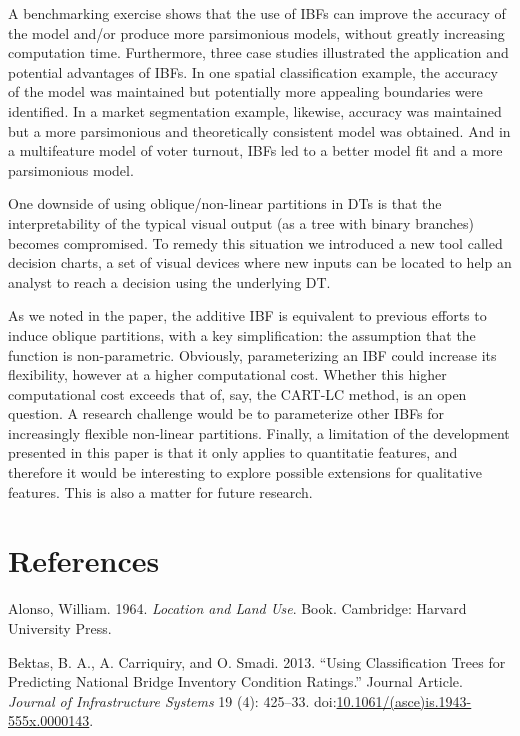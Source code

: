 \documentclass[]{elsarticle} %
\begin{document}
A benchmarking exercise shows that the use of IBFs can improve the
accuracy of the model and/or produce more parsimonious models, without
greatly increasing computation time. Furthermore, three case studies
illustrated the application and potential advantages of IBFs. In one
spatial classification example, the accuracy of the model was maintained
but potentially more appealing boundaries were identified. In a market
segmentation example, likewise, accuracy was maintained but a more
parsimonious and theoretically consistent model was obtained. And in a
multifeature model of voter turnout, IBFs led to a better model fit and
a more parsimonious model.

One downside of using oblique/non-linear partitions in DTs is that the
interpretability of the typical visual output (as a tree with binary
branches) becomes compromised. To remedy this situation we introduced a
new tool called decision charts, a set of visual devices where new
inputs can be located to help an analyst to reach a decision using the
underlying DT.

As we noted in the paper, the additive IBF is equivalent to previous
efforts to induce oblique partitions, with a key simplification: the
assumption that the function is non-parametric. Obviously,
parameterizing an IBF could increase its flexibility, however at a
higher computational cost. Whether this higher computational cost
exceeds that of, say, the CART-LC method, is an open question. A
research challenge would be to parameterize other IBFs for increasingly
flexible non-linear partitions. Finally, a limitation of the development
presented in this paper is that it only applies to quantitatie features,
and therefore it would be interesting to explore possible extensions for
qualitative features. This is also a matter for future research.

\section*{References}\label{references}

\hypertarget{refs}{}
\hypertarget{ref-Alonso1964}{}
Alonso, William. 1964. \emph{Location and Land Use}. Book. Cambridge:
Harvard University Press.

\hypertarget{ref-Bektas2013}{}
Bektas, B. A., A. Carriquiry, and O. Smadi. 2013. ``Using Classification
Trees for Predicting National Bridge Inventory Condition Ratings.''
Journal Article. \emph{Journal of Infrastructure Systems} 19 (4):
425--33.
doi:\href{https://doi.org/10.1061/(asce)is.1943-555x.0000143}{10.1061/(asce)is.1943-555x.0000143}.
\end{document}
